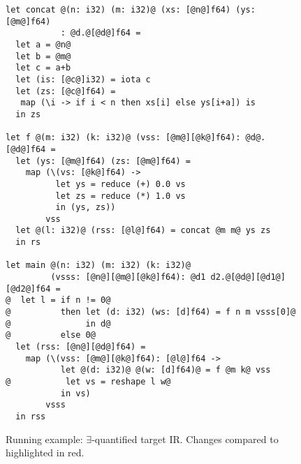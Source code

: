 \begin{figure}
\begin{lstlisting}
let concat @(n: i32) (m: i32)@ (xs: [@n@]f64) (ys: [@m@]f64)
           : @d.@[@d@]f64 =
  let a = @n@
  let b = @m@
  let c = a+b
  let (is: [@c@]i32) = iota c
  let (zs: [@c@]f64) =
   map (\i -> if i < n then xs[i] else ys[i+a]) is
  in zs

let f @(m: i32) (k: i32)@ (vss: [@m@][@k@]f64): @d@.[@d@]f64 =
  let (ys: [@m@]f64) (zs: [@m@]f64) =
    map (\(vs: [@k@]f64) ->
          let ys = reduce (+) 0.0 vs
          let zs = reduce (*) 1.0 vs
          in (ys, zs))
        vss
  let @(l: i32)@ (rss: [@l@]f64) = concat @m m@ ys zs
  in rs

let main @(n: i32) (m: i32) (k: i32)@
         (vsss: [@n@][@m@][@k@]f64): @d1 d2.@[@d@][@d1@][@d2@]f64 =
@  let l = if n != 0@
@          then let (d: i32) (ws: [d]f64) = f n m vsss[0]@
@               in d@
@          else 0@
  let (rss: [@n@][@d@]f64) =
    map (\(vss: [@m@][@k@]f64): [@l@]f64 ->
           let @(d: i32)@ @(w: [d]f64)@ = f @m k@ vss
@           let vs = reshape l w@
           in vs)
        vsss
  in rss
\end{lstlisting}

  \caption{Running example:
    $\exists$-quantified target IR.  Changes compared to
     highlighted in red.}
\label{fig:RunEgTgt}
\end{figure}

